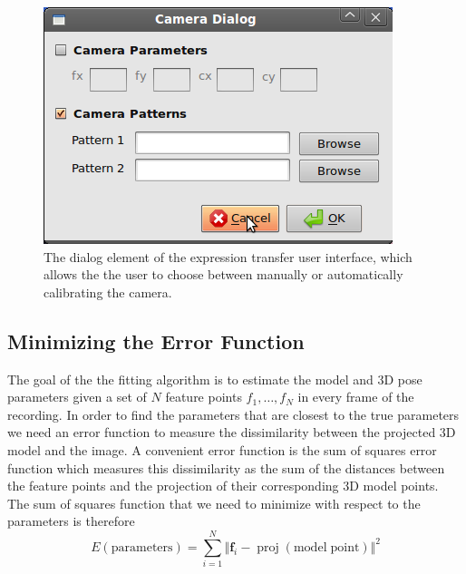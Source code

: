 \documentclass[11pt,a4paper]{report}
\begin{document}
\begin{figure}[H]
\begin{centering}
\includegraphics[scale=0.60]{images/cameraDialog.png}
\par\end{centering}

\caption{The dialog element of the expression transfer user interface, which
  allows the the user to choose between manually or automatically calibrating
  the camera.}
\label{fg:camdialog}

\end{figure}

\subsection{Minimizing the Error Function}\label{s:minerror}
The goal of the the fitting algorithm is to estimate the model and 3D pose
parameters given a set of $N$ feature points $f_1, \ldots , f_N$ in every frame of the recording. In
order to find the parameters that are closest to the true parameters we need an error
function to measure the dissimilarity between the projected 3D model and
the image. A convenient error function is the sum of squares error function
which measures this dissimilarity as the
sum of the distances between the feature points and the
projection of their corresponding 3D model points. The sum of squares
function that we need to minimize with respect to the parameters is therefore
\begin{equation}\label{eq:fit0}
E(\mathrm{parameters}) = \sum_{i=1}^N \Big\Vert\mathbf{f}_i - \mathop{proj}(\mathrm{model\; point})\Big\Vert^2
\end{equation}
\end{document}
